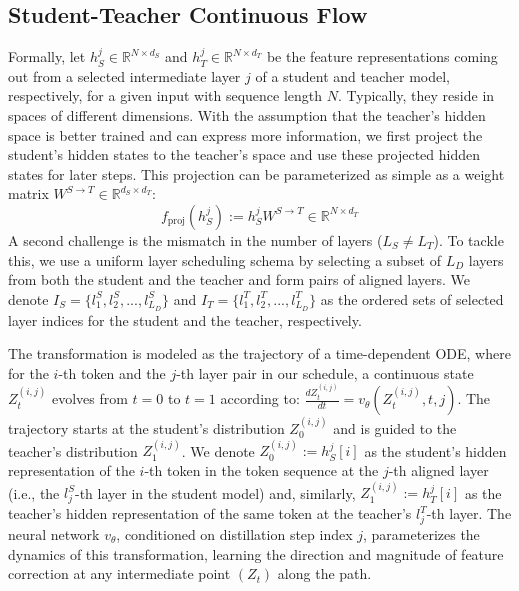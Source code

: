 \documentclass{article} %
\theoremstyle{definition}
\theoremstyle{remark}
\begin{document}
\subsection{Student-Teacher Continuous Flow} 
\label{sec:flow_construct}
Formally, let $h_S^j \in \mathbb{R}^{N \times d_S}$ and $h_T^j \in \mathbb{R}^{N \times d_T}$ be the feature representations coming out from a selected intermediate layer $j$ of a student and teacher model, respectively, for a given input with sequence length $N$. Typically, they reside in spaces of different dimensions. With the assumption that the teacher's hidden space is better trained and can express more information, we first project the student's hidden states to the teacher's space and use these projected hidden states for later steps. This projection can be parameterized as simple as a weight matrix $W^{S \xrightarrow{} T} \in \mathbb{R}^{d_S \times d_T}$:
\[
f_{\text{proj}} (h_S^j) := h_S^j W^{S \xrightarrow{} T} \in \mathbb{R}^{N \times d_T}
\]
A second challenge is the mismatch in the number of layers ($L_S \neq L_T$). To tackle this, we use a uniform layer scheduling schema by selecting a subset of $L_D$ layers from both the student and the teacher and form pairs of aligned layers. We denote $I_S = \{l_1^S, l_2^S, ..., l_{L_D}^S\}$ and $I_T = \{l_1^T, l_2^T, ..., l_{L_D}^T\}$ as the ordered sets of selected layer indices for the student and the teacher, respectively.

The transformation is modeled as the trajectory of a time-dependent ODE, where for the $i$-th token and the $j$-th layer pair in our schedule, a continuous state $Z_t^{(i,j)}$ evolves from $t=0$ to $t=1$ according to:
$\frac{d Z_t^{(i,j)}}{dt} = v_\theta(Z_t^{(i,j)}, t, j)$. The trajectory starts at the student's distribution $Z_0^{(i,j)}$ and is guided to the teacher's distribution $Z_1^{(i,j)}$. We denote $Z_0^{(i,j)} := h_S^{j}[i]$ as the student's hidden representation of the $i$-th token in the token sequence at the $j$-th aligned layer (i.e., the $l_j^S$-th layer in the student model) and, similarly, $Z_1^{(i,j)} := h_T^{j}[i]$ as the teacher's hidden representation of the same token at the teacher's $l_j^T$-th layer. The neural network  $v_\theta$, conditioned on distillation step index $j$, parameterizes the dynamics of this transformation, learning the direction and magnitude of feature correction at any intermediate point $(Z_t)$ along the path.
\end{document}
